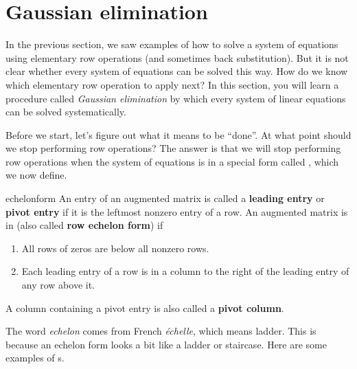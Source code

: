 \section{Gaussian elimination}

In the previous section, we saw examples of how to solve a system of
equations using elementary row operations (and sometimes back
substitution). But it is not clear whether every system of equations
can be solved this way. How do we know which elementary row operation
to apply next? In this section, you will learn a procedure called {\em
  Gaussian elimination} by which every system of linear equations can
be solved systematically.

Before we start, let's figure out what it means to be ``done''. At
what point should we stop performing row operations? The answer is
that we will stop performing row operations when the system of
equations is in a special form called {\em {\ef}}, which we now define.

\begin{definition}{\Ef}{echelonform}
  An entry of an augmented matrix is called a
  \textbf{leading entry} or
  \textbf{pivot entry}
  if it is the leftmost nonzero entry of a row. 
  An augmented matrix is in
  \textbf{\ef}\eindex{\ef}
  (also called \textbf{row echelon form}) if
  \begin{enumerate}
  \item All rows of zeros are below all nonzero rows.
    
  \item Each leading entry of a row is in a column to the right of the
    leading entry of any row above it.
  \end{enumerate}
  A column containing a pivot entry is also called a
  \textbf{pivot column}.
\end{definition}

The word {\em echelon} comes from French {\em \'echelle}, which means
ladder. This is because an echelon form looks a bit like a ladder or
staircase. Here are some examples of {\ef}s.


